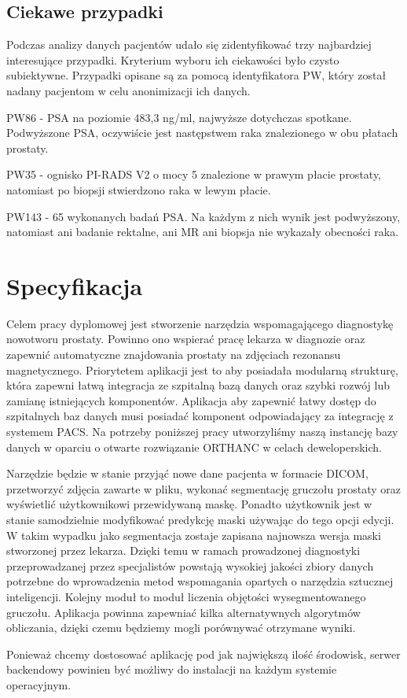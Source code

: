 \documentclass[a4paper,11pt,twoside]{report}
\theoremstyle{definition}
\begin{document}
\section{Ciekawe przypadki}
Podczas analizy danych pacjentów udało się zidentyfikować trzy najbardziej interesujące przypadki. Kryterium wyboru ich ciekawości było czysto subiektywne. Przypadki opisane są za pomocą identyfikatora PW, który został nadany pacjentom w celu anonimizacji ich danych.
\par
\begin{description}
\item  PW86 - PSA na poziomie 483,3 ng/ml, najwyższe dotychczas spotkane. Podwyższone PSA, oczywiście jest następstwem raka znalezionego w obu płatach prostaty.
\item  PW35 - ognisko PI-RADS V2 o mocy 5 znalezione w prawym płacie prostaty, natomiast po biopsji stwierdzono raka w lewym płacie.
\item  PW143 - 65 wykonanych badań PSA. Na każdym z nich wynik jest podwyższony, natomiast ani badanie rektalne, ani MR ani biopsja nie wykazały obecności raka.
\end{description}


\chapter{Specyfikacja} %

Celem pracy dyplomowej jest stworzenie narzędzia wspomagającego diagnostykę nowotworu prostaty. Powinno ono wspierać pracę lekarza w diagnozie oraz zapewnić automatyczne znajdowania prostaty na zdjęciach rezonansu magnetycznego. Priorytetem aplikacji jest to aby posiadała modularną strukturę, która zapewni łatwą integracja ze szpitalną bazą danych oraz szybki rozwój lub zamianę istniejących komponentów. Aplikacja aby zapewnić łatwy dostęp do szpitalnych baz danych musi posiadać komponent odpowiadający za integrację z systemem PACS. Na potrzeby poniższej pracy utworzyliśmy naszą instancję bazy danych w oparciu o otwarte rozwiązanie ORTHANC \cite{Orthanc} w celach deweloperskich.
\par
Narzędzie będzie w stanie przyjąć nowe dane pacjenta w formacie DICOM, przetworzyć zdjęcia zawarte w pliku, wykonać segmentację gruczołu prostaty oraz wyświetlić użytkownikowi przewidywaną maskę. Ponadto użytkownik jest w stanie samodzielnie modyfikować predykcję maski używając do tego opcji edycji. W takim wypadku jako segmentacja zostaje zapisana najnowsza wersja maski stworzonej przez lekarza. Dzięki temu w ramach prowadzonej diagnostyki przeprowadzanej przez specjalistów powstają wysokiej jakości zbiory danych potrzebne do wprowadzenia metod wspomagania opartych o narzędzia sztucznej inteligencji. Kolejny moduł to moduł liczenia objętości wysegmentowanego gruczołu. Aplikacja powinna zapewniać kilka alternatywnych algorytmów obliczania, dzięki czemu będziemy mogli porównywać otrzymane wyniki.
\par
Ponieważ chcemy dostosować aplikację pod jak największą ilość środowisk, serwer backendowy powinien być możliwy do instalacji na każdym systemie operacyjnym.
\end{document}
